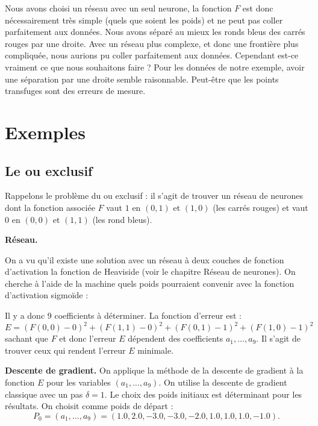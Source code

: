 {\begin{exemple}{}{}
	
	Nous avons choisi un réseau avec un seul neurone, la fonction $F$ est donc nécessairement très simple (quels que soient les poids) et ne peut pas \og{}coller\fg{} parfaitement aux données. 
	Nous avons séparé au mieux les ronds bleus des carrés rouges par une droite. Avec un réseau plus complexe, et donc une frontière plus compliquée, nous aurions pu \og{}coller\fg{} parfaitement aux données. Cependant est-ce vraiment ce que nous souhaitons faire ? Pour les données de notre exemple, avoir une séparation par une droite semble raisonnable. Peut-être que les points transfuges sont des erreurs de mesure.
	
\end{exemple}




\section{Exemples}

\subsection{Le \og{}ou exclusif\fg{}}

Rappelons le problème du \og{}ou exclusif\fg{} : il s'agit de trouver un réseau de neurones dont la fonction associée $F$ vaut $1$ en $(0,1)$ et $(1,0)$ (les carrés rouges) et vaut $0$ en $(0,0)$ et $(1,1)$ (les rond bleus).


\textbf{Réseau.}

On a vu qu'il existe une solution avec un réseau à deux couches de fonction d'activation la fonction de Heaviside (voir le chapitre \og{}Réseau de neurones\fg{}).
On cherche à l'aide de la machine quels poids pourraient convenir avec la fonction d'activation sigmoïde :

Il y a donc $9$ coefficients à déterminer.
La fonction d'erreur est :
$$E = (F(0,0) - 0)^2 + (F(1,1) - 0)^2 + (F(0,1)-1)^2 + (F(1,0) - 1)^2$$
sachant que $F$ et donc l'erreur $E$ dépendent des coefficients $a_1,\ldots,a_9$.
Il s'agit de trouver ceux qui rendent l'erreur $E$ minimale.

\bigskip

\textbf{Descente de gradient.}
On applique la méthode de la descente de gradient à la fonction $E$ pour les variables $(a_1,\ldots,a_9)$.
On utilise la descente de gradient classique avec un pas $\delta = 1$. 
Le choix des poids initiaux est déterminant pour les résultats.
On choisit comme poids de départ :
$$P_0 = (a_1,\ldots,a_9) = (1.0, 2.0, -3.0, -3.0, -2.0, 1.0, 1.0, 1.0, -1.0).$$


}
